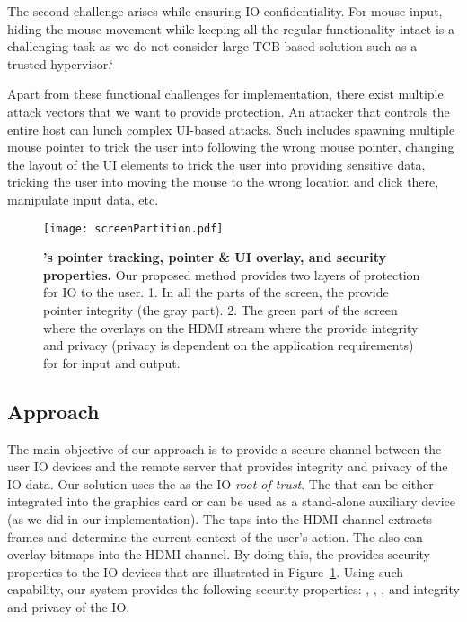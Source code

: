 The second challenge arises while ensuring IO confidentiality. For mouse input, hiding the mouse movement while keeping all the regular functionality intact is a challenging task as we do not consider large TCB-based solution such as a trusted hypervisor.`


Apart from these functional challenges for implementation, there exist multiple attack vectors that we want to provide protection. An attacker that controls the entire host can lunch complex UI-based attacks. Such includes spawning multiple mouse pointer to trick the user into following the wrong mouse pointer, changing the layout of the UI elements to trick the user into providing sensitive data, tricking the user into moving the mouse to the wrong location and click there, manipulate input data, etc.


\begin{figure}[t]
\centering
\texttt{[image: screenPartition.pdf]}
\caption{\textbf{\device's pointer tracking, pointer \& UI overlay, and security properties.} Our proposed method provides two layers of protection for IO to the user. 1. In all the parts of the screen, the \device provide pointer integrity (the gray part). 2. The green part of the screen where the \device overlays on the HDMI stream where the \device provide integrity and privacy (privacy is dependent on the application requirements) for for input and output.}
\label{fig:screenPartition}
\centering
\end{figure}

\subsection{Approach}

The main objective of our approach is to provide a secure channel between the user IO devices and the remote server that provides integrity and privacy of the IO data. Our solution uses the \device as the IO \emph{root-of-trust}. The \device that can be either integrated into the graphics card or can be used as a stand-alone auxiliary device (as we did in our implementation). The \device taps into the HDMI channel extracts frames and determine the current context of the user's action. The \device also can overlay bitmaps into the HDMI channel. By doing this, the \device provides security properties to the IO devices that are illustrated in Figure~\ref{fig:screenPartition}. Using such capability, our system provides the following security properties: \emph{\pop}, \emph{\poui}, \emph{\poa}, and integrity and privacy of the IO.

